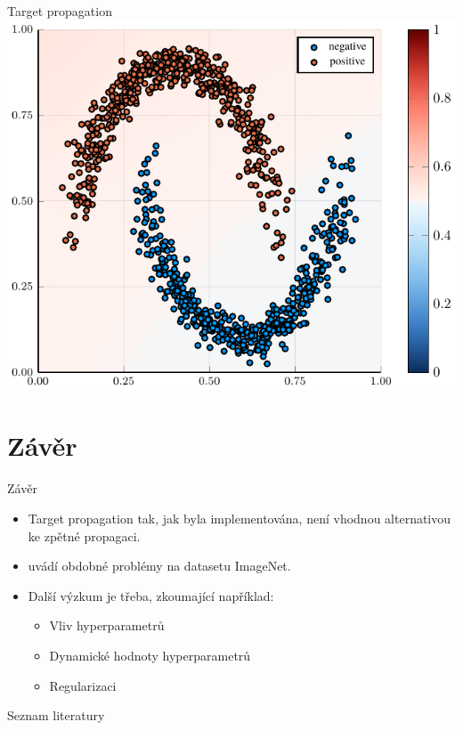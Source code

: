 \documentclass[10pt]{beamer}
\begin{document}
\begin{frame}{Target propagation}
	\centering
	\includegraphics[width=0.6\pagewidth]{images/relu-heatmap/relu.pdf}
\end{frame}

\section{Závěr}

\begin{frame}{Závěr}
	\begin{itemize}
		\item Target propagation tak, jak byla implementována, není vhodnou alternativou ke zpětné propagaci.
		\item \cite{bartunov_assessing_2018} uvádí obdobné problémy na datasetu ImageNet.
		\item Další výzkum je třeba, zkoumající například:
		\begin{itemize}
			\item Vliv hyperparametrů
			\item Dynamické hodnoty hyperparametrů
			\item Regularizaci
		\end{itemize}
	\end{itemize}
\end{frame}

\begin{frame}{Seznam literatury}
	\printbibliography
\end{frame}
\end{document}
